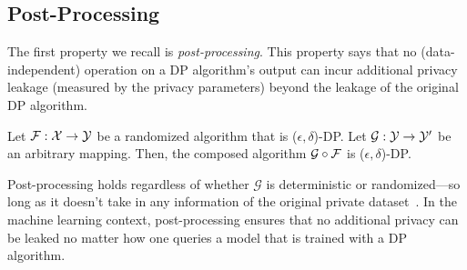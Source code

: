\subsection{Post-Processing}
The first property we recall is \emph{post-processing}.
This property says that no (data-independent) operation on a DP algorithm's output can incur additional privacy leakage (measured by the privacy parameters) beyond the leakage of the original DP algorithm.
\begin{prop}
Let $\mathcal{F}: \mathcal{X} \to \mathcal{Y}$ be a randomized algorithm that is ($\epsilon, \delta$)-DP.
Let $\mathcal{G}: \mathcal{Y} \to \mathcal{Y}'$ be an arbitrary mapping. 
Then, the composed algorithm $\mathcal{G} \circ \mathcal{F}$ is ($\epsilon, \delta$)-DP.
\end{prop}
Post-processing holds regardless of whether $\mathcal{G}$ is deterministic or randomized---so long as it doesn't take in any information of the original private dataset~\citep{dwork2014algorithmic}.
In the machine learning context, post-processing ensures that no additional privacy can be leaked no matter how one queries a model that is trained with a DP algorithm.



